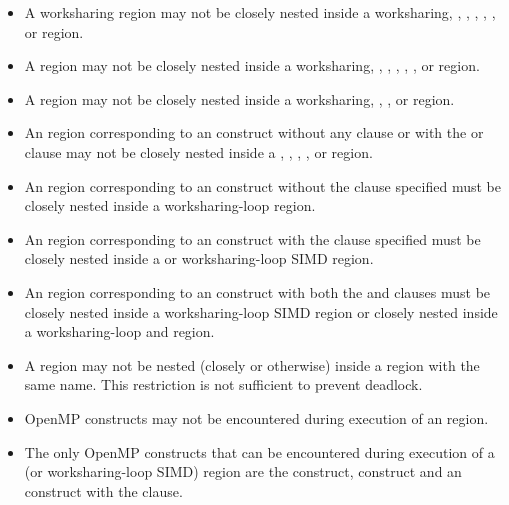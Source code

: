 \begin{itemize}
\item A worksharing region may not be closely nested inside a worksharing,
, , , ,
, or  region.

\item A  region may not be closely nested inside a worksharing,
, , , ,
, or  region.

\item A  region may not be closely nested inside a worksharing,
, , or  region.

\item An  region corresponding to an  construct without
any clause or with the  or  clause may not be closely
nested inside a , , , ,
or  region.

\item An  region corresponding to an  construct without
the  clause specified must be closely nested inside a worksharing-loop region.

\item An  region corresponding to an  construct with the
 clause specified must be closely nested inside a  or
    worksharing-loop SIMD region.

\item An  region corresponding to an  construct with
  both the  and  clauses must be closely nested inside
  a worksharing-loop SIMD region or closely nested inside a worksharing-loop and  region.

\item A  region may not be nested (closely or otherwise) inside a 
region with the same name. This restriction is not sufficient to prevent
deadlock.

\item OpenMP constructs may not be encountered during execution of an
 region.

\item The only OpenMP constructs that can be encountered during execution of a
   (or worksharing-loop SIMD) region are the  construct,
   construct and an  construct with the  clause.


\end{itemize}
